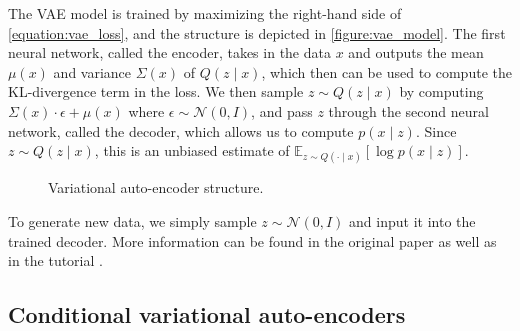 \documentclass[10pt]{article}
\newcommand{\op}[1]{\operatorname{#1}}
\begin{document}
The VAE model is trained by maximizing the right-hand side of \eqref{equation:vae_loss}, and the structure is depicted in \autoref{figure:vae_model}. The first neural network, called the encoder, takes in the data $x$ and outputs the mean $\mu(x)$ and variance $\Sigma(x)$ of $Q(z \mid x)$, which then can be used to compute the KL-divergence term in the loss. We then sample $z \sim Q(z \mid x)$ by computing $\Sigma(x)\cdot \epsilon + \mu(x)$ where $\epsilon \sim \mathcal{N}(0,I)$, and pass $z$ through the second neural network, called the decoder, which allows us to compute $p(x \mid z)$. Since $z \sim Q(z \mid x)$, this is an unbiased estimate of $\mathbb{E}_{z \sim Q(\cdot \mid x)} [\log p(x \mid z)]$.


\begin{figure}[!ht]
\centering
{}
\caption{Variational auto-encoder structure.}
\label{figure:vae_model}
\end{figure}

To generate new data, we simply sample $z \sim \mathcal{N}(0,I)$ and input it into the trained decoder.
More information can be found in the original paper \cite{kingma2013auto} as well as in the tutorial \cite{doersch2016tutorial}.


\subsection{Conditional variational auto-encoders}
\end{document}
